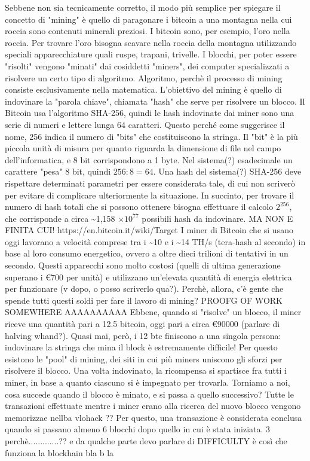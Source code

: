 \documentclass {article}
\begin{document}
Sebbene non sia tecnicamente corretto, il modo più semplice per spiegare il concetto di "mining" è quello di paragonare i bitcoin a una montagna nella cui roccia sono contenuti minerali preziosi.
I bitcoin sono, per esempio, l'oro nella roccia.
Per trovare l'oro bisogna scavare nella roccia della montagna utilizzando speciali apparecchiature quali ruspe, trapani, trivelle.
I blocchi, per poter essere "risolti" vengono "minati" dai cosiddetti "miners", dei computer specializzati a risolvere un certo tipo di algoritmo.
Algoritmo, perchè il processo di mining consiste esclusivamente nella matematica.
L'obiettivo del mining è quello di indovinare la "parola chiave", chiamata "hash" che serve per risolvere un blocco.
Il Bitcoin usa l'algoritmo SHA-256, quindi le hash indovinate dai miner sono una serie di numeri e lettere lunga 64 caratteri.
Questo perché come suggerisce il nome, 256 indica il numero di "bits" che costituiscono la stringa.
Il "bit" è la più piccola unità di misura per quanto riguarda la dimensione di file nel campo dell'informatica, e 8 bit corrispondono a 1 byte.
Nel sistema(?) esadecimale un carattere "pesa" 8 bit, quindi $256 : 8 = 64$.
Una hash del sistema(?) SHA-256 deve rispettare determinati parametri per essere considerata tale, di cui non scriverò per evitare di complicare ulteriormente la situazione.
In succinto, per trovare il numero di hash totali che si possono ottenere bisogna effettuare il  calcolo $2^{256}$, che corrisponde a circa \textasciitilde 1,158 $\times 10^{77}$ possibili hash da indovinare.
MA NON E FINITA CUI! https://en.bitcoin.it/wiki/Target
I miner di Bitcoin che si usano oggi lavorano a velocità comprese tra i \textasciitilde 10 e i \textasciitilde 14 TH/s (tera-hash al secondo) in base al loro consumo energetico, ovvero a oltre dieci trilioni di tentativi in un secondo.
Questi apparecchi sono molto costosi (quelli di ultima generazione superano i \euro{700} per unità) e utilizzano un'elevata quantità di energia elettrica per funzionare (v dopo, o posso scriverlo qua?).
Perchè, allora, c'è gente che spende tutti questi soldi per fare il lavoro di mining? PROOFG  OF WORK SOMEWHERE AAAAAAAAAA
Ebbene, quando si "risolve" un blocco, il miner riceve una quantità pari a 12.5 bitcoin, oggi pari a circa \euro{90000} (parlare di halving whand?).
Quasi mai, però, i 12 btc finiscono a una singola persona: indovinare la stringa che mina il block è estremamente difficile!
Per questo esistono le "pool" di mining, dei siti in cui più miners uniscono gli sforzi per risolvere il blocco.
Una volta indovinato, la ricompensa si spartisce fra tutti i miner, in base a quanto ciascuno si è impegnato per trovarla.
Torniamo a noi, cosa succede quando il blocco è minato, e si passa a quello successivo?
Tutte le transazioni effettuate mentre i miner erano alla ricerca del nuovo blocco vengono memorizzae nellba vlohack ??
Per questo, una transazione è considerata conclusa quando si passano almeno 6 blocchi dopo quello in cui è stata iniziata.
3 perchè.............?? e da qualche parte devo parlare di DIFFICULTY
è così che funziona la blockhain bla b la
\end{document}
